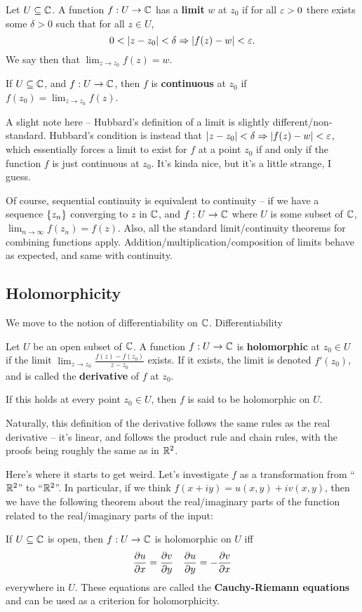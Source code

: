 \begin{definition}
  Let $U \subseteq \mathbb C$. A function $f : U \to \mathbb C$ has a \textbf{limit} $w$ at $z_0$ if for all $\varepsilon > 0$ there exists some $\delta > 0$ such that for all $z \in U$, \[ 0 < | z - z_0 | < \delta \Rightarrow |f(z) - w| < \varepsilon .\] We say then that $\lim_{z \to z_0} f(z) = w$.
\end{definition}
\begin{definition}
  If $U \subseteq \mathbb C$, and $f : U \to \mathbb C$, then $f$ is \textbf{continuous} at $z_0$ if $f(z_0) = \lim_{z \to z_0} f(z)$.
\end{definition}
A slight note here -- Hubbard's definition of a limit is slightly different/non-standard. Hubbard's condition is instead that $ | z - z_0 | < \delta \Rightarrow |f(z) - w| < \varepsilon$, which essentially forces a limit to exist for $f$ at a point $z_0$ if and only if the function $f$ is just continuous at $z_0$. It's kinda nice, but it's a little strange, I guess.

Of course, sequential continuity is equivalent to continuity -- if we have a sequence $\left\{ z_n \right\}$ converging to $z$ in $\mathbb C$, and $f : U \to \mathbb C$ where $U$ is some subset of $\mathbb C$, $\lim_{n \to \infty} f(z_n) = f(z)$. Also, all the standard limit/continuity theorems for combining functions apply. Addition/multiplication/composition of limits behave as expected, and same with continuity.


\subsection{Holomorphicity}
We move to the notion of differentiability on $\mathbb C$. Differentiability

\begin{definition}
  Let $U$ be an open subset of $\mathbb C$. A function $f : U \to \mathbb C$ is \textbf{holomorphic} at $z_0 \in U$ if the limit $\lim_{z \to z_0} \frac{f(z) - f(z_0)}{z - z_0}$ exists. If it exists, the limit is denoted $f'(z_0)$, and is called the \textbf{derivative} of $f$ at $z_0$.

  If this holds at every point $z_0 \in U$, then $f$ is said to be holomorphic on $U$.
\end{definition}


Naturally, this definition of the derivative follows the same rules as the real derivative -- it's linear, and follows the product rule and chain rules, with the proofs being roughly the same as in $\mathbb R^2$.

Here's where it starts to get weird. Let's investigate $f$ as a transformation from ``$\mathbb R^2$'' to ``$\mathbb R^2$''. In particular, if we think $f(x + iy) = u(x,y) + i v(x,y)$, then we have the following theorem about the real/imaginary parts of the function related to the real/imaginary parts of the input:
\begin{theorem}
  If $U \subseteq \mathbb C$ is open, then $f : U \to \mathbb C$ is holomorphic on $U$ iff \[ \frac{\partial u}{\partial x} = \frac{\partial v}{\partial y} \quad \frac{\partial u}{\partial y} = - \frac{\partial v}{\partial x}\] everywhere in $U$.
  These equations are called the \textbf{Cauchy-Riemann equations} and can be used as a criterion for holomorphicity.
\end{theorem}


